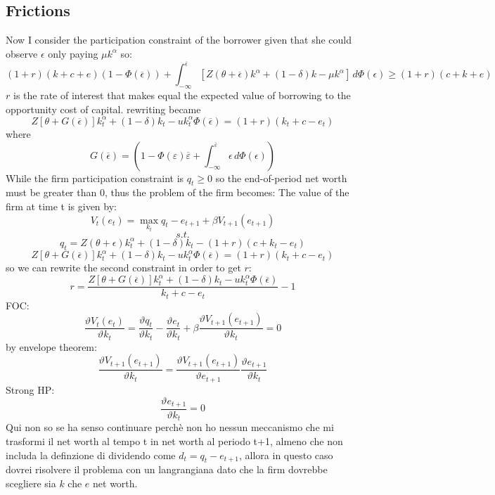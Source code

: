 \documentclass[12pt]{article}
\begin{document}
\subsection{Frictions}
Now I consider the participation constraint of the borrower given that she could observe \(\epsilon\) only paying \(\mu
k^\alpha\) so:
\[
 (1+r )(k+c+e)(1-\Phi(\overline{\epsilon}))+\int_{-\infty}^{\overline{\epsilon}}[Z(\theta+\overline{\epsilon})
k^\alpha+(1-\delta)k-\mu k^\alpha] \,d\Phi(\epsilon) \geq (1+r)(c+k+e)
 \]
\(r\) is the rate of interest that makes equal the expected value of borrowing to the opportunity cost of capital.
rewriting became 
\[
Z[\theta+G(\overline{\epsilon} )]k_t^\alpha+(1-\delta)k_t-uk_t^\alpha\Phi (\overline{\epsilon})=(1+r)(k_t+c-e_t)
\]
where
\[G(\overline{\epsilon} )= (1-\Phi(\varepsilon )\overline{\varepsilon }
+\int_{-\infty}^{\overline{\varepsilon}}\epsilon\,d \Phi(\epsilon) )\]
While the firm participation constraint is \(q_t \geq 0 \) so the end-of-period net worth must be greater than 0, thus
the problem of the firm becomes:
The value of the firm at time t is given by:
\[V_t(e_t) =\max_{k_t}  q_t - e_{t+1} + \beta V_{t+1}(e_{t+1})\]
\[s.t.\]
\[q_{t} = Z(\theta +\epsilon)k_t^\alpha + (1-\delta )k_t - (1+r)(c+k_t-e_t)\]
\[
Z[\theta+G(\overline{\epsilon} )]k_t^\alpha+(1-\delta)k_t-uk_t^\alpha\Phi (\overline{\epsilon})=(1+r)(k_t+c-e_t)
\]
so we can rewrite the second constraint in order to get \(r\):
\[r = \frac{Z[\theta+G(\overline{\epsilon} )]k_t^\alpha+(1-\delta)k_t-uk_t^\alpha\Phi (\overline{\epsilon})}{k_t+c-e_t}-1\]
FOC:
\[\frac{\vartheta
V_{t}(e_{t})}{\vartheta k_t } = \frac{\vartheta
q_{t}}{\vartheta k_t } - \frac{\vartheta
e_{t}}{\vartheta k_t } + \beta \frac{\vartheta
V_{t+1}(e_{t+1})}{\vartheta k_{t} } = 0\]
by envelope theorem:
\[\frac{\vartheta
V_{t+1}(e_{t+1})}{\vartheta k_{t} } = \frac{\vartheta
V_{t+1}(e_{t+1})}{\vartheta e_{t+1} }\frac{\vartheta e_{t+1}}{\vartheta k_t}\]
Strong HP: \[\frac{\vartheta e_{t+1}}{\vartheta k_t} = 0\]
Qui non so se ha senso continuare perchè non ho nessun meccanismo che mi trasformi il net worth al tempo t in net worth
al periodo t+1, almeno che non includa la definzione di dividendo come \(d_t= q_t-e_{t+1}\), allora in questo caso
dovrei risolvere il problema con un langrangiana dato che la firm dovrebbe scegliere sia \(k\) che \(e\) net worth.
\end{document}
